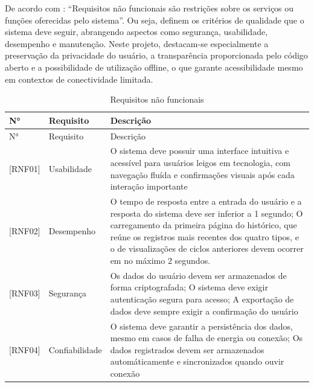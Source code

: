 De acordo com \cite[p.~89]{sommerville:2010}: ``Requisitos não funcionais são
restrições sobre os serviços ou funções oferecidas pelo sistema''. Ou seja,
definem os critérios de qualidade que o sistema deve seguir, abrangendo
aspectos como segurança, usabilidade, desempenho e manutenção. Neste projeto,
destacam-se especialmente a preservação da privacidade do usuário, a
transparência proporcionada pelo código aberto e a possibilidade de utilização
offline, o que garante acessibilidade mesmo em contextos de conectividade
limitada.

\begin{longtable}{| p{} | p{} | p{} |}
    \caption{Requisitos não funcionais}
    \label{tab:requisitos_nao_funcionais} \\
        \hline
        N° & Requisito & Descrição \\
        \hline
        \endfirsthead
        \hline
        N° & Requisito & Descrição \\
        \hline
        \endhead
        \endfoot

        [RNF01] &
        Usabilidade &

        O sistema deve possuir uma interface intuitiva e acessível para
        usuários leigos em tecnologia, com navegação fluída e confirmações
        visuais após cada interação importante \\

        \hline

        [RNF02] &
        Desempenho &

        O tempo de resposta entre a entrada do usuário e a resposta do sistema
        deve ser inferior a 1 segundo; O carregamento da primeira página do
        histórico, que reúne os registros mais recentes dos quatro tipos, e o
        de visualizações de ciclos anteriores devem ocorrer em no máximo 2
        segundos. \\

        \hline

        [RNF03] &
        Segurança &

        Os dados do usuário devem ser armazenados de forma criptografada; O
        sistema deve exigir autenticação segura para acesso; A exportação de
        dados deve sempre exigir a confirmação do usuário \\
        \hline

        [RNF04] &
        Confiabilidade &

        O sistema deve garantir a persistência dos dados, mesmo em casos de
        falha de energia ou conexão; Os dados registrados devem ser armazenados
        automáticamente e sincronizados quando ouvir conexão \\


\end{longtable}

